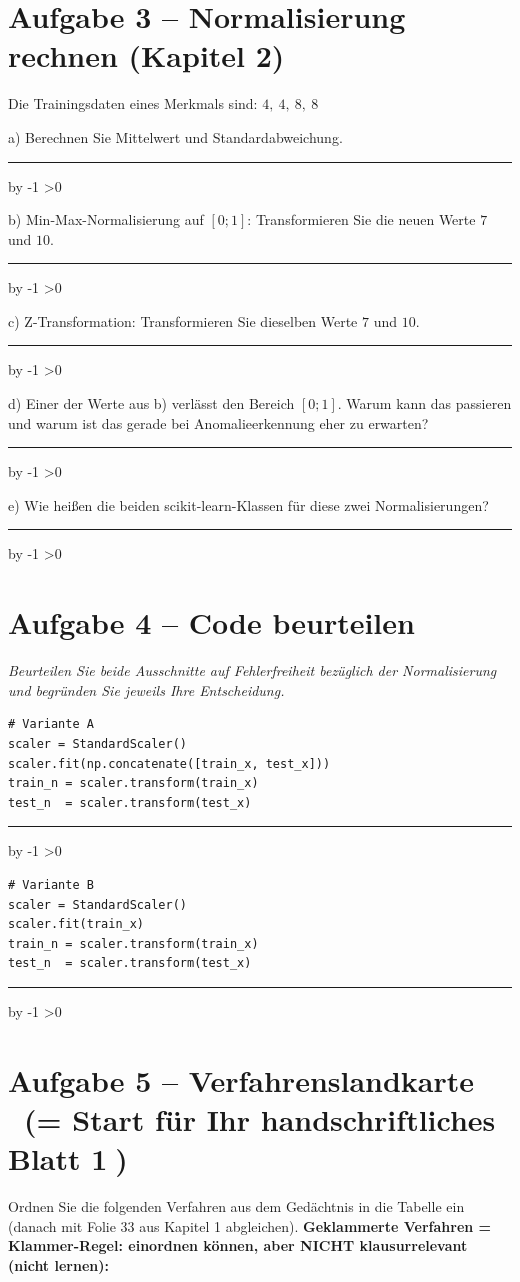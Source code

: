 \documentclass[10pt,a4paper]{article}
\newcommand{\antwortlinien}[1]{%
  \par\vspace{2pt}%
  \newcount\zeilen \zeilen=#1
  \loop
    \noindent\rule{\linewidth}{0.4pt}\par\vspace{11pt}%
    \advance\zeilen by -1
  \ifnum\zeilen>0 \repeat
}
\begin{document}
\section*{Aufgabe 3 -- Normalisierung rechnen (Kapitel 2)}

Die Trainingsdaten eines Merkmals sind: \quad $4,\ 4,\ 8,\ 8$

a) Berechnen Sie Mittelwert und Standardabweichung.
\antwortlinien{2}

b) Min-Max-Normalisierung auf $[0;1]$: Transformieren Sie die neuen Werte $7$ und $10$.
\antwortlinien{2}

c) Z-Transformation: Transformieren Sie dieselben Werte $7$ und $10$.
\antwortlinien{2}

d) Einer der Werte aus b) verlässt den Bereich $[0;1]$. Warum kann das passieren und warum
ist das gerade bei Anomalieerkennung eher zu erwarten?
\antwortlinien{3}

e) Wie heißen die beiden scikit-learn-Klassen für diese zwei Normalisierungen?
\antwortlinien{1}

\section*{Aufgabe 4 -- Code beurteilen}

\emph{Beurteilen Sie beide Ausschnitte auf Fehlerfreiheit bezüglich der Normalisierung und
begründen Sie jeweils Ihre Entscheidung.}

\Needspace*{5.5cm}
\begin{lstlisting}
# Variante A
scaler = StandardScaler()
scaler.fit(np.concatenate([train_x, test_x]))
train_n = scaler.transform(train_x)
test_n  = scaler.transform(test_x)
\end{lstlisting}
\antwortlinien{3}

\Needspace*{5.5cm}
\begin{lstlisting}
# Variante B
scaler = StandardScaler()
scaler.fit(train_x)
train_n = scaler.transform(train_x)
test_n  = scaler.transform(test_x)
\end{lstlisting}
\antwortlinien{3}

\Needspace*{13.5cm}
\section*{Aufgabe 5 -- Verfahrenslandkarte \ (= Start für Ihr handschriftliches Blatt \textcircled{\small 1})}

Ordnen Sie die folgenden Verfahren aus dem Gedächtnis in die Tabelle ein
(danach mit Folie 33 aus Kapitel 1 abgleichen). \textbf{Geklammerte Verfahren = Klammer-Regel:
einordnen können, aber NICHT klausurrelevant (nicht lernen):}
\end{document}
